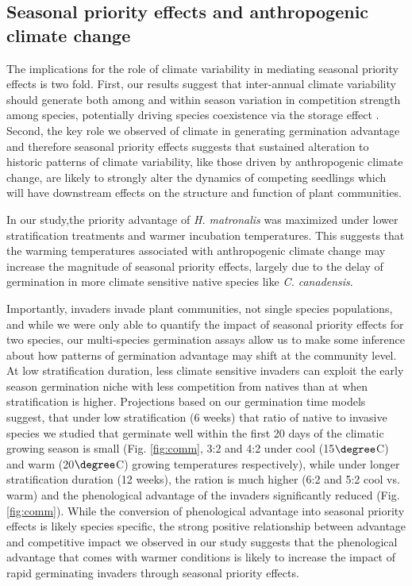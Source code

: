 \documentclass{article}\usepackage[]{graphicx}\usepackage[]{color}
\begin{document}
\subsection*{Seasonal priority effects and anthropogenic climate change}
The implications for the role of climate variability in mediating seasonal priority effects is two fold. First, our results suggest that inter-annual climate variability should generate both among and within season variation in competition strength among species, potentially driving species coexistence via the storage effect \citep{}. Second, the key role we observed of climate in generating germination advantage and therefore seasonal priority effects suggests that sustained alteration to historic patterns of climate variability, like those driven by anthropogenic climate change, are likely to strongly alter the dynamics of competing seedlings which will have downstream effects on the structure and function of plant communities.

In our study,the priority advantage of \textit{H. matronalis} was maximized under lower stratification treatments and warmer incubation temperatures. This suggests that the warming temperatures associated with anthropogenic climate change may increase the magnitude of seasonal priority effects, largely due to the delay of germination in more climate sensitive native species like \textit{C. canadensis}.

Importantly, invaders invade plant communities, not single species populations, and while we were only able to quantify the impact of seasonal priority effects for two species, our multi-species germination assays allow us to make some inference about how patterns of germination advantage may shift at the community level. At low stratification duration, less climate sensitive invaders can exploit the early season germination niche with less competition from natives than at when stratification is higher. Projections based on our germination time models suggest, that under low stratification (6 weeks) that ratio of native to invasive species we studied that germinate well within the first 20 days of the climatic growing season is small (Fig. \ref{fig:comm}, 3:2 and 4:2 under cool (15$\degree$C) and warm (20$\degree$C) growing temperatures respectively), while under longer stratification duration (12 weeks), the ration is much higher (6:2 and 5:2 cool vs. warm) and the phenological advantage of the invaders significantly reduced (Fig. \ref{fig:comm}). While the conversion of phenological advantage into seasonal priority effects is likely species specific, the strong positive relationship between advantage and competitive impact we observed in our study suggests that the phenological advantage that comes with warmer conditions is likely to increase the impact of rapid germinating invaders through seasonal priority effects. 
\end{document}
